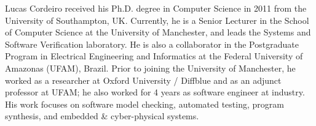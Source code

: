 \documentclass[10pt,journal,compsoc]{IEEEtran}
\begin{document}
\begin{IEEEbiography}
    {Lucas Cordeiro}
received his Ph.D. degree in Computer Science in 2011 from the University of Southampton, UK. Currently, he is a Senior Lecturer in the School of Computer Science at the University of Manchester, and leads the Systems and Software Verification laboratory. He is also a collaborator in the Postgraduate Program in Electrical Engineering and Informatics at the Federal University of Amazonas (UFAM), Brazil. Prior to joining the University of Manchester, he worked as a researcher at Oxford University / Diffblue and as an adjunct professor at UFAM; he also worked for 4 years as software engineer at industry. His work focuses on software model checking, automated testing, program synthesis, and embedded \& cyber-physical systems.
\end{IEEEbiography}
\end{document}
